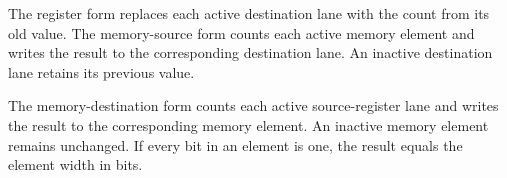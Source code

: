 The register form replaces each active destination lane with the count from its
old value. The memory-source form counts each active memory element and writes
the result to the corresponding destination lane. An inactive destination lane
retains its previous value.

The memory-destination form counts each active source-register lane and writes
the result to the corresponding memory element. An inactive memory element
remains unchanged. If every bit in an element is one, the result equals the
element width in bits.
